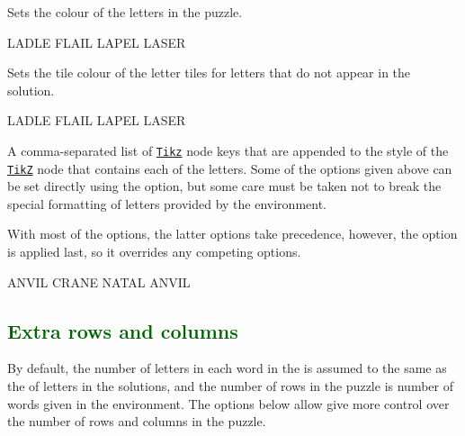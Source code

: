 \documentclass[svgnames]{report}
\newcommand\ctan[1]{\href{https://www.ctan.org/pkg/#1}{\texttt{#1}}}
\newcommand\Section[1]{\subsection{\textcolor{DarkGreen}{#1}}}
\begin{document}

  Sets the colour of the letters in the  puzzle.

  \begin{example}
    \begin{wordle}[text=DarkSlateGrey]{LADLE}
       FLAIL LAPEL LASER
    \end{wordle}
  \end{example}


  Sets the tile colour of the  letter tiles for letters
  that do not appear in the solution.

  \begin{example}
    \begin{wordle}[absent=red]{LADLE}
       FLAIL LAPEL LASER
    \end{wordle}
  \end{example}


  A comma-separated list of \ctan{Tikz} node keys that are appended to
  the style of the \ctan{TikZ} node that contains each of the
   letters.  Some of the options given above can be set
  directly using the  option, but some care must be
  taken not to break the special formatting of letters provided by the
   environment.\par

  With most of the  options, the latter options take
  precedence, however, the  option is applied last,
  so it overrides any competing options.

  \begin{example}
    \begin{wordle}[tilestyle={rounded corners}]{ANVIL}
      CRANE
      NATAL
      ANVIL
    \end{wordle}
  \end{example}

  \Section{Extra rows and columns}

  By default, the number of letters in each word in the 
  is assumed to the same as the of letters in the solutions, and the
  number of rows in the puzzle is number of words given in the
  environment. The options below allow give more control over the number
  of rows and columns in the puzzle.
\end{document}
